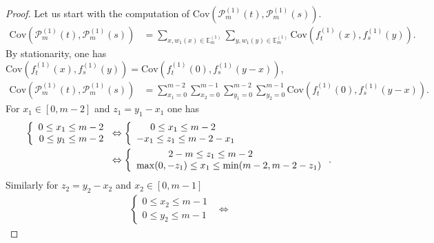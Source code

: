\documentclass[12pt]{article}
\theoremstyle{Theorem}
\theoremstyle{definition}
\begin{document}
\begin{proof}
Let us start with the computation of $\text{Cov}(\mathcal{P}_{m}^{\scriptscriptstyle (1)}(t), \mathcal{P}_{m}^{\scriptscriptstyle (1)}(s))$. 
\begin{align*}
\text{Cov}(\mathcal{P}_{m}^{\scriptscriptstyle (1)}(t), \mathcal{P}_{m}^{\scriptscriptstyle (1)}(s))& = \sum_{x, w_{1}(x) \in \mathbb{E}^{\scriptscriptstyle (1)}_{m}} \sum_{y, w_{1}(y) \in \mathbb{E}^{\scriptscriptstyle (1)}_{m}} \text{Cov}\left(f_{t}^{\scriptscriptstyle (1)}(x), f_{s}^{\scriptscriptstyle (1)}(y) \right).
\end{align*}
By stationarity, one has $\text{Cov}\left(f_{t}^{\scriptscriptstyle (1)}(x), f_{s}^{\scriptscriptstyle (1)}(y) \right)= \text{Cov}\left(f_{t}^{\scriptscriptstyle (1)}(0), f_{s}^{\scriptscriptstyle (1)}(y-x) \right)$, 
\begin{align*}
\text{Cov}\left(\mathcal{P}_{m}^{\scriptscriptstyle (1)}(t),\mathcal{P}_{m}^{\scriptscriptstyle (1)}(s) \right) & = \sum_{x_1 = 0}^{m-2}\sum_{x_2 = 0}^{m-1}\sum_{y_1 = 0}^{m-2}\sum_{y_2 = 0}^{m-1} \text{Cov}\left(f_{t}^{\scriptscriptstyle (1)}(0), f_{s}^{ \scriptscriptstyle (1)}(y-x) \right).
\end{align*}
For $x_1 \in [0,m-2]$ and $z_1 = y_1 - x_1$ one has
\begin{align*} 
\left\{
\begin{array}{rcl}
0 \leq x_1 \leq m-2 \\
0 \leq y_1 \leq m-2 
\end{array}\right.& \Leftrightarrow  \left\{ \begin{array}{rcl}
0 \leq x_1 \leq m-2 \hspace{0.7cm} \\
-x_1 \leq z_1 \leq m-2 - x_1
\end{array}\right. \\
& \Leftrightarrow  \left\{
\begin{array}{rcl}
2-m \leq z_1 \leq m-2 \hspace{2.5cm}  \\
\max(0, -z_1) \leq x_1 \leq \min(m-2 , m-2-z_1)
\end{array}\right..
\end{align*} 
Similarly for $z_2 = y_2 - x_2$ and $x_2 \in [0, m-1]$
\begin{align*}
 \left\{
\begin{array}{rcl}
0 \leq x_2 \leq m-1 \\
0 \leq y_2 \leq m-1 
\end{array}\right. & \Leftrightarrow

\end{align*}
\end{proof}
\end{document}
